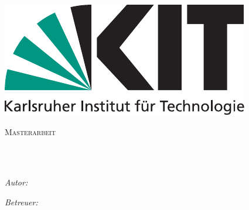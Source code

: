 \documentclass[
11pt, %
ngerman, %
singlespacing, %
headsepline, %
]{MastersDoctoralThesis} %
\author{Daniel \textsc{Dittmar}} %
\begin{document}
\frontmatter %

\pagestyle{plain} %


\begin{titlepage}
\begin{center}
\includegraphics{Figures/kitlogo_de_rgb.pdf} %
\linebreak
\vspace*{.06\textheight}
{\scshape\LARGE \univname\par}\vspace{1.5cm} %
\textsc{\Large Masterarbeit}\\[0.5cm] %

\HRule \\[0.4cm] %
{\huge \bfseries \ttitle\par}\vspace{0.4cm} %
\HRule \\[1.5cm] %
 
\begin{minipage}[t]{0.4\textwidth}
\begin{flushleft} \large
\emph{Autor:}\\
{\authorname} %
\end{flushleft}
\end{minipage}
\begin{minipage}[t]{0.4\textwidth}
\begin{flushright} \large
\emph{Betreuer:} \\
\href{http://www.math.kit.edu/ianm3/~jahnke}{\supname} %
\end{flushright}
\end{minipage}\\[3cm]
 

\end{center}
\end{titlepage}
\end{document}
